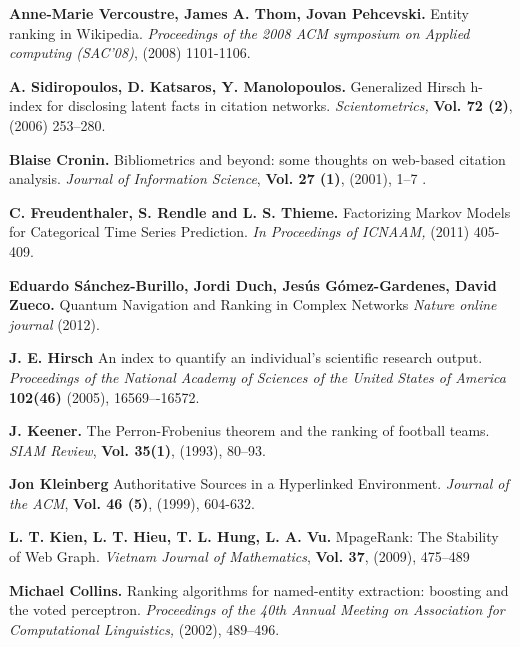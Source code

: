 \documentclass[10pt,leqno,twoside]{article}
\begin{document}
\vspace{-3ex}
\begin{thebibliography}{99}
\setlength{\parskip}{-3pt}\vspace{-2ex}

\textbf{Anne-Marie Vercoustre, James A. Thom, Jovan Pehcevski.}
Entity ranking in Wikipedia.
\textit{Proceedings of the 2008 ACM symposium on Applied computing (SAC'08)},
(2008) 1101-1106.

\textbf{A. Sidiropoulos, D. Katsaros, Y. Manolopoulos.}
Generalized Hirsch h-index for disclosing latent facts in citation networks.
\textit{Scientometrics,} \textbf{Vol. 72 (2)}, (2006) 253--280.

\textbf{Blaise Cronin.}
Bibliometrics and beyond: some thoughts on web-based citation analysis.
\textit{Journal of Information Science},
\textbf{Vol. 27 (1)}, (2001), 1--7 .


\textbf{C. Freudenthaler, S. Rendle and L. S. Thieme.}
Factorizing Markov Models for Categorical Time Series Prediction.
\textit{In Proceedings of ICNAAM, } (2011) 405-409.

\textbf{Eduardo Sánchez-Burillo, Jordi Duch, Jesús Gómez-Gardenes, David Zueco.}
Quantum Navigation and Ranking in Complex Networks
\textit{Nature online journal} (2012).

\textbf{J. E. Hirsch}
An index to quantify an individual's scientific research output.
\textit{Proceedings of the National Academy of Sciences of the United States of America} \textbf{102(46)}
(2005), 16569–-16572.



\textbf{J. Keener.}
The Perron-Frobenius theorem and the ranking of football teams.
\textit{SIAM Review}, \textbf{Vol. 35(1)}, (1993), 80--93.

\textbf{Jon Kleinberg}
Authoritative Sources in a Hyperlinked Environment.
\textit{Journal of the ACM}, \textbf{Vol. 46 (5)}, (1999), 604-632.



\textbf{L. T. Kien, L. T. Hieu, T. L. Hung, L. A. Vu.}
MpageRank: The Stability of Web Graph.
\textit{Vietnam Journal of Mathematics}, \textbf{Vol. 37}, (2009), 475--489

\textbf{Michael Collins.}
Ranking algorithms for named-entity extraction: boosting and the voted perceptron.
\textit{Proceedings of the 40th Annual Meeting on Association for Computational Linguistics,}
(2002), 489--496.



\end{thebibliography}
\end{document}
